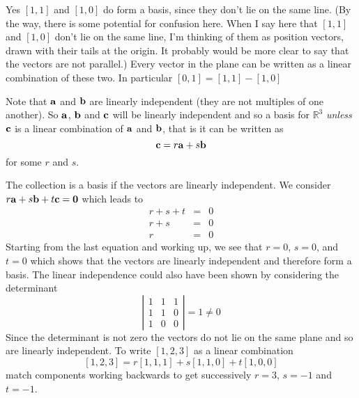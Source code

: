 \vspace{2mm}
Yes $[1,1]$ and $[1,0]$ do form a basis, since they don't lie on the same line.
(By the way, there is some potential for confusion here. When I say here that
$[1,1]$ and $[1,0]$ don't lie on the same line, I'm thinking of them as position
vectors, drawn with their tails at the origin. It probably would be more clear
to say that the vectors are not parallel.) Every vector in the plane can be
written as a linear combination of these two. In particular $[0,1]=[1,1]-[1,0]$

\vspace{2mm}
Note that $\aa$ and $\bb$ are linearly independent (they are not multiples 
of one another). So $\aa$, $\bb$ and $\cc$ will be linearly independent and 
so a basis for $\mathbb{R}^3$ {\em unless} $\cc$ is a linear 
combination of $\aa$ and $\bb$, that is it can be written as 
\[
\cc = r \aa + s \bb
\]
for some $r$ and $s$. 

\vspace{2mm}
The collection is a basis if the vectors are linearly independent. We 
consider $r \aa + s \bb + t \cc = \bf 0$ which leads to 
\begin{eqnarray*}
r + s + t & = & 0 \\
r + s & = & 0 \\
r & = & 0 
\end{eqnarray*}
Starting from the last equation and working up, we see that $r=0$, $s=0$, 
and $t=0$ which shows that the vectors are linearly independent and 
therefore form a basis. The linear independence could also have been 
shown by considering the determinant 
\[
\left| \begin{array}{ccc} 1 & 1 & 1 \\ 1& 1 & 0 \\ 1 & 0 & 0 \end{array}
\right| = 1 \neq 0 
\]
Since the determinant is not zero the vectors do not lie on the same plane 
and so are linearly independent. To write $[1,2,3]$ as a linear 
combination 
\[
[1,2,3] = r[1,1,1] + s [1,1,0] + t [1,0,0] 
\]
match components working backwards to get successively $r=3$, $s=-1$ 
and $t=-1$.

